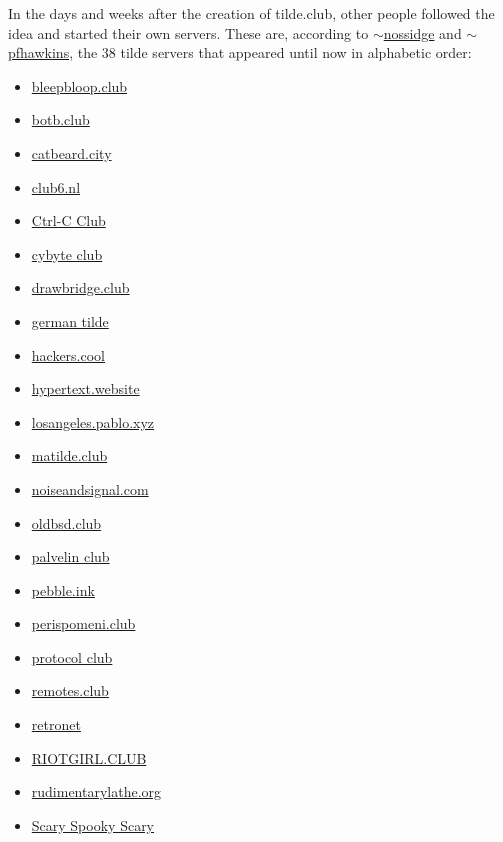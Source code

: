 In the days and weeks after the creation of tilde.club, other people followed the idea and started their own servers. These are, according to \href{https://tilde.town/~nossidge/tildeverse/boxes.html}{$\sim$nossidge} and \href{http://tilde.club/~pfhawkins/othertildes.html}{$\sim$pfhawkins}, the 38 tilde servers that appeared until now in alphabetic order:
\begin{multicols}{2}
	\begin{itemize}
		\item \href{https://bleepbloop.club/}{bleepbloop.club}
		\item \href{https://botb.club/}{botb.club}
		\item \href{http://catbeard.city/}{catbeard.city}
		\item \href{https://club6.nl}{club6.nl}
		\item \href{http://ctrl-c.club/}{Ctrl-C Club}
		\item \href{http://cybyte.club/}{cybyte club}
		\item \href{http://drawbridge.club/}{drawbridge.club}
		\item \href{http://germantil.de/}{german tilde}
		\item \href{http://hackers.cool/}{hackers.cool}
		\item \href{http://hypertext.website/}{hypertext.website}
		\item \href{http://losangeles.pablo.xyz/}{losangeles.pablo.xyz}
		\item \href{http://matilde.club/}{matilde.club}
		\item \href{http://noiseandsignal.com/}{noiseandsignal.com}
		\item \href{http://oldbsd.club/}{oldbsd.club}
		\item \href{http://palvelin.club/}{palvelin club}
		\item \href{http://pebble.ink/}{pebble.ink}
		\item \href{http://perispomeni.club/}{perispomeni.club}
		\item \href{http://protocol.club/}{protocol club}
		\item \href{https://remotes.club/}{remotes.club}
		\item \href{http://retronet.net/}{retronet}
		\item \href{http://riotgirl.club/}{RIOTGIRL.CLUB}
		\item \href{http://rudimentarylathe.org/}{rudimentarylathe.org}
		\item \href{https://spookyscary.science/}{Scary Spooky Scary}

\end{itemize}
\end{multicols}
